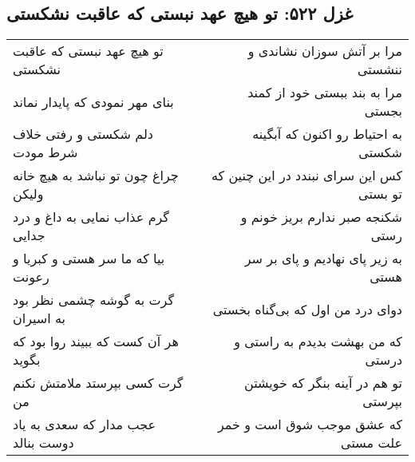 \begin{center}
\section*{غزل ۵۲۲: تو هیچ عهد نبستی که عاقبت نشکستی}
\label{sec:522}
\begin{longtable}{l p{0.5cm} r}
تو هیچ عهد نبستی که عاقبت نشکستی
&&
مرا بر آتش سوزان نشاندی و ننشستی
\\
بنای مهر نمودی که پایدار نماند
&&
مرا به بند ببستی خود از کمند بجستی
\\
دلم شکستی و رفتی خلاف شرط مودت
&&
به احتیاط رو اکنون که آبگینه شکستی
\\
چراغ چون تو نباشد به هیچ خانه ولیکن
&&
کس این سرای نبندد در این چنین که تو بستی
\\
گرم عذاب نمایی به داغ و درد جدایی
&&
شکنجه صبر ندارم بریز خونم و رستی
\\
بیا که ما سر هستی و کبریا و رعونت
&&
به زیر پای نهادیم و پای بر سر هستی
\\
گرت به گوشه چشمی نظر بود به اسیران
&&
دوای درد من اول که بی‌گناه بخستی
\\
هر آن کست که ببیند روا بود که بگوید
&&
که من بهشت بدیدم به راستی و درستی
\\
گرت کسی بپرستد ملامتش نکنم من
&&
تو هم در آینه بنگر که خویشتن بپرستی
\\
عجب مدار که سعدی به یاد دوست بنالد
&&
که عشق موجب شوق است و خمر علت مستی
\\
\end{longtable}
\end{center}
